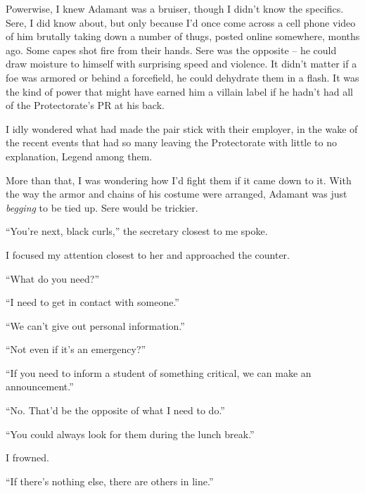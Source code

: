 Powerwise, I knew Adamant was a bruiser, though I didn't know the specifics.  Sere, I did know about, but only because I'd once come across a cell phone video of him brutally taking down a number of thugs, posted online somewhere, months ago.  Some capes shot fire from their hands.  Sere was the opposite – he could draw moisture to himself with surprising speed and violence.  It didn't matter if a foe was armored or behind a forcefield, he could dehydrate them in a flash.  It was the kind of power that might have earned him a villain label if he hadn't had all of the Protectorate's PR at his back.



I idly wondered what had made the pair stick with their employer, in the wake of the recent events that had so many leaving the Protectorate with little to no explanation, Legend among them.



More than that, I was wondering how I'd fight them if it came down to it.  With the way the armor and chains of his costume were arranged, Adamant was just \emph{begging} to be tied up. Sere would be trickier.



``You're next, black curls,'' the secretary closest to me spoke.



I focused my attention closest to her and approached the counter.



``What do you need?''



``I need to get in contact with someone.''



``We can't give out personal information.''



``Not even if it's an emergency?''



``If you need to inform a student of something critical, we can make an announcement.''



``No.  That'd be the opposite of what I need to do.''



``You could always look for them during the lunch break.''



I frowned.



``If there's nothing else, there are others in line.''



